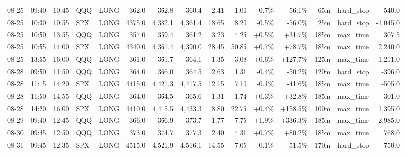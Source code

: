 \documentclass[11pt,a4paper,twoside]{article}
\begin{document}
\begin{landscape}
\begin{center}
\begin{longtable}{>{\color{txtmain}}l l l l l r r r r r r r r >{\color{txtmain}}l r}
08-25 & 09:40 & 10:45 & QQQ & LONG & 362.0 & 362.8 & 360.4 & 2.41 & 1.06 & \textcolor{lossred}{-0.7\%} & \textcolor{lossred}{-56.1\%} & 65m & hard\_stop & \textcolor{lossred}{-540.0} \\
08-25 & 10:30 & 10:55 & SPX & LONG & 4375.0 & 4,382.1 & 4,361.4 & 18.65 & 8.20 & \textcolor{lossred}{-0.5\%} & \textcolor{lossred}{-56.0\%} & 25m & hard\_stop & \textcolor{lossred}{-1,045.0} \\
08-25 & 10:50 & 13:55 & QQQ & LONG & 357.0 & 359.4 & 361.2 & 3.23 & 4.25 & \textcolor{wingreen}{+0.5\%} & \textcolor{wingreen}{+31.7\%} & 185m & max\_time & \textcolor{wingreen}{307.5} \\
08-25 & 10:55 & 14:00 & SPX & LONG & 4340.0 & 4,361.4 & 4,390.0 & 28.45 & 50.85 & \textcolor{wingreen}{+0.7\%} & \textcolor{wingreen}{+78.7\%} & 185m & max\_time & \textcolor{wingreen}{2,240.0} \\
08-25 & 13:55 & 16:00 & QQQ & LONG & 361.0 & 361.7 & 364.1 & 1.35 & 3.08 & \textcolor{wingreen}{+0.6\%} & \textcolor{wingreen}{+127.7\%} & 125m & max\_time & \textcolor{wingreen}{1,211.0} \\
08-28 & 09:50 & 11:50 & QQQ & LONG & 364.0 & 366.0 & 364.5 & 2.63 & 1.31 & \textcolor{lossred}{-0.4\%} & \textcolor{lossred}{-50.2\%} & 120m & hard\_stop & \textcolor{lossred}{-396.0} \\
08-28 & 11:15 & 14:20 & SPX & LONG & 4415.0 & 4,421.3 & 4,417.5 & 12.15 & 7.10 & \textcolor{lossred}{-0.1\%} & \textcolor{lossred}{-41.6\%} & 185m & max\_time & \textcolor{lossred}{-505.0} \\
08-28 & 11:50 & 14:55 & QQQ & LONG & 364.0 & 364.5 & 365.6 & 1.31 & 1.74 & \textcolor{wingreen}{+0.3\%} & \textcolor{wingreen}{+32.8\%} & 185m & max\_time & \textcolor{wingreen}{301.0} \\
08-28 & 14:20 & 16:00 & SPX & LONG & 4410.0 & 4,415.5 & 4,433.3 & 8.80 & 22.75 & \textcolor{wingreen}{+0.4\%} & \textcolor{wingreen}{+158.5\%} & 100m & max\_time & \textcolor{wingreen}{1,395.0} \\
08-29 & 09:40 & 12:45 & QQQ & LONG & 366.0 & 366.9 & 373.7 & 1.77 & 7.75 & \textcolor{wingreen}{+1.9\%} & \textcolor{wingreen}{+336.3\%} & 185m & max\_time & \textcolor{wingreen}{2,985.0} \\
08-30 & 09:45 & 12:50 & QQQ & LONG & 373.0 & 374.7 & 377.3 & 2.40 & 4.31 & \textcolor{wingreen}{+0.7\%} & \textcolor{wingreen}{+80.2\%} & 185m & max\_time & \textcolor{wingreen}{768.0} \\
08-31 & 09:45 & 12:35 & SPX & LONG & 4515.0 & 4,521.9 & 4,516.1 & 14.55 & 7.05 & \textcolor{lossred}{-0.1\%} & \textcolor{lossred}{-51.5\%} & 170m & hard\_stop & \textcolor{lossred}{-750.0} \\

\end{longtable}
\end{center}
\end{landscape}
\end{document}
